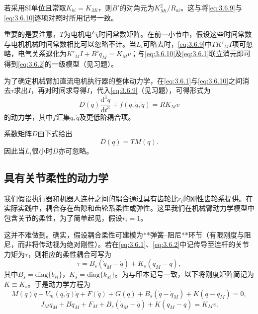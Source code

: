 \documentclass[12pt,a4paper]{ctexart}
\begin{document}
若采用SI单位且常取$K_{bi}=K_{Mi}$，则$B'$的对角元为$K_{Mi}^2/R_{ai}$。这与将\eqref{eq:3.6.9}与\eqref{eq:3.6.10}逐项对照时所用记号一致。

重要的是要注意，$T$为电机电气时间常数矩阵。在前一小节中，假设这些时间常数与电机机械时间常数相比可以忽略不计。当$L_i$可略去时，\eqref{eq:3.6.9}中$T K'_M\dot I$项可忽略，电气关系退化为$K'_M I+B'\dot q_M=K_M v$；与\eqref{eq:3.6.10}及\eqref{eq:3.6.1}联立消元即可得到\eqref{eq:3.6.2}的一级模型（见习题）。

为了确定机械臂加直流电机执行器的整体动力学，在\eqref{eq:3.6.1}与\eqref{eq:3.6.10}之间消去$\tau$求出$I$，再对时间求导得$\dot{I}$，代入\eqref{eq:3.6.9}（见习题），可得形式为
\begin{equation}\label{eq:3.6.12}
D(q)\frac{\mathrm{d}^3 q}{\mathrm{d}t^3} + f(q,\dot{q},\ddot{q}) = R K_M v
\end{equation}
的动力学，其中$f$汇集$\dot q,\ddot q$及更低阶耦合项。

系数矩阵$D$由下式给出
\begin{equation}\label{eq:3.6.13}
D(q) = T M(q).
\end{equation}
因此当$L_i$很小时$D$亦可忽略。

\subsection{具有关节柔性的动力学}

我们假设执行器和机器人连杆之间的耦合通过具有齿轮比$r_i$的刚性齿轮系提供。在实际实践中，耦合存在齿隙和齿轮系柔性或弹性。这里我们在机械臂动力学模型中包含关节的柔性，为了简单起见，假设$r_i = 1$。

这并不难做到。确实，假设耦合柔性可建模为**弹簧–阻尼**环节（有限刚度与阻尼，而非将传动视为绝对刚性）。若在\eqref{eq:3.6.1}、\eqref{eq:3.6.2}中记传导至连杆的关节力矩为$\tau$，则相应的柔性耦合可写为
\begin{equation}\label{eq:3.6.14}
\tau = B_s(\dot{q}_M - \dot{q}) + K_s(q_M - q),
\end{equation}
其中$B_s = \mathrm{diag}\{b_{si}\}$，$K_s = \mathrm{diag}\{k_{si}\}$。为与印本记号一致，以下将刚度矩阵简记为$K\equiv K_s$。于是动力学方程为
\begin{equation}\label{eq:3.6.15}
M(q)\ddot{q} + V_m(q,\dot{q})\dot{q} + F(\dot{q}) + G(q) + B_s(\dot{q} - \dot{q}_M) + K(q - q_M) = 0,
\end{equation}
\begin{equation}\label{eq:3.6.16}
J_M\ddot{q}_M + B\dot{q}_M + F_M + B_s(\dot{q}_M - \dot{q}) + K(q_M - q) = K_M v.
\end{equation}
\end{document}
